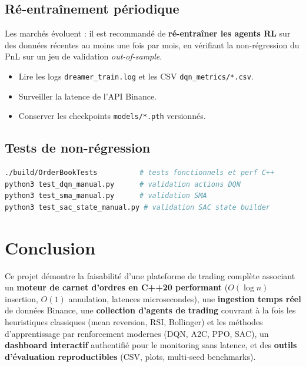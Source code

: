 \documentclass[11pt,a4paper]{article}
\begin{document}
\subsection{Ré-entraînement périodique}

Les marchés évoluent : il est recommandé de
\textbf{ré-entraîner les agents RL} sur des données
récentes au moins une fois par mois, en vérifiant la
non-régression du PnL sur un jeu de validation
\textit{out-of-sample}.


\begin{itemize}[leftmargin=1.2cm]
    \item Lire les logs \texttt{dreamer\_train.log} et les
          CSV \texttt{dqn\_metrics/*.csv}.
    \item Surveiller la latence de l'API Binance.
    \item Conserver les checkpoints
          \texttt{models/*.pth} versionnés.
\end{itemize}

\subsection{Tests de non-régression}

\begin{lstlisting}[language=bash]
./build/OrderBookTests          # tests fonctionnels et perf C++
python3 test_dqn_manual.py      # validation actions DQN
python3 test_sma_manual.py      # validation SMA
python3 test_sac_state_manual.py # validation SAC state builder
\end{lstlisting}

\section{Conclusion}
\label{sec:conclusion}

Ce projet démontre la faisabilité d'une plateforme de
trading complète associant un \textbf{moteur de carnet
d'ordres en C++20 performant} ($O(\log n)$ insertion,
$O(1)$ annulation, latences microsecondes), une
\textbf{ingestion temps réel} de données Binance, une
\textbf{collection d'agents de trading} couvrant à la
fois les heuristiques classiques (mean reversion, RSI,
Bollinger) et les méthodes d'apprentissage par
renforcement modernes (DQN, A2C, PPO, SAC),
un \textbf{dashboard interactif} authentifié pour le monitoring
sans latence, et des \textbf{outils d'évaluation reproductibles}
(CSV, plots, multi-seed benchmarks).
\end{document}
